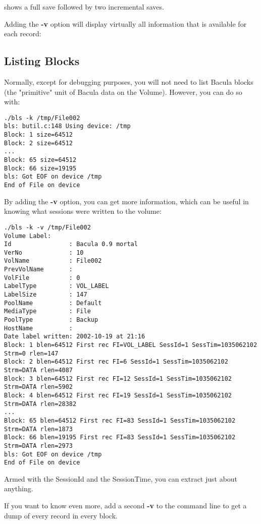 shows a full save followed by two incremental saves. 

Adding the {\bf -v} option will display virtually all information that is
available for each record: 

\subsection{Listing Blocks}

Normally, except for debugging purposes, you will not need to list Bacula
blocks (the "primitive" unit of Bacula data on the Volume). However, you can
do so with: 

\footnotesize
\begin{verbatim}
./bls -k /tmp/File002
bls: butil.c:148 Using device: /tmp
Block: 1 size=64512
Block: 2 size=64512
...
Block: 65 size=64512
Block: 66 size=19195
bls: Got EOF on device /tmp
End of File on device
\end{verbatim}
\normalsize

By adding the {\bf -v} option, you can get more information, which can be
useful in knowing what sessions were written to the volume: 

\footnotesize
\begin{verbatim}
./bls -k -v /tmp/File002
Volume Label:
Id                : Bacula 0.9 mortal
VerNo             : 10
VolName           : File002
PrevVolName       :
VolFile           : 0
LabelType         : VOL_LABEL
LabelSize         : 147
PoolName          : Default
MediaType         : File
PoolType          : Backup
HostName          :
Date label written: 2002-10-19 at 21:16
Block: 1 blen=64512 First rec FI=VOL_LABEL SessId=1 SessTim=1035062102 Strm=0 rlen=147
Block: 2 blen=64512 First rec FI=6 SessId=1 SessTim=1035062102 Strm=DATA rlen=4087
Block: 3 blen=64512 First rec FI=12 SessId=1 SessTim=1035062102 Strm=DATA rlen=5902
Block: 4 blen=64512 First rec FI=19 SessId=1 SessTim=1035062102 Strm=DATA rlen=28382
...
Block: 65 blen=64512 First rec FI=83 SessId=1 SessTim=1035062102 Strm=DATA rlen=1873
Block: 66 blen=19195 First rec FI=83 SessId=1 SessTim=1035062102 Strm=DATA rlen=2973
bls: Got EOF on device /tmp
End of File on device
\end{verbatim}
\normalsize

Armed with the SessionId and the SessionTime, you can extract just about
anything. 

If you want to know even more, add a second {\bf -v} to the command line to
get a dump of every record in every block. 

